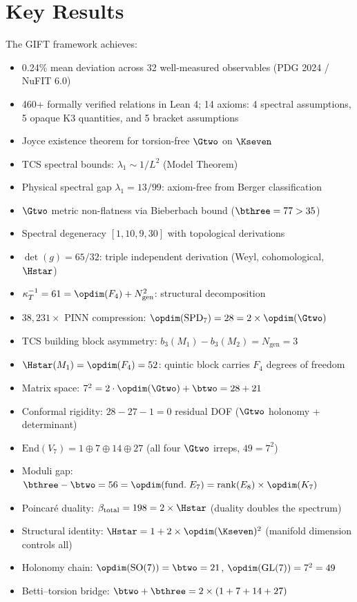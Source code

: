 \section{Key Results}

The GIFT framework achieves:
\begin{itemize}
    \item 0.24\% mean deviation across 32 well-measured observables (PDG 2024 / NuFIT 6.0)
    \item 460+ formally verified relations in Lean 4; 14 axioms: 4 spectral assumptions, 5 opaque K3 quantities, and 5 bracket assumptions
    \item Joyce existence theorem for torsion-free $\Gtwo$ on $\Kseven$
    \item TCS spectral bounds: $\lambda_1 \sim 1/L^2$ (Model Theorem)
    \item Physical spectral gap $\lambda_1 = 13/99$: axiom-free from Berger classification
    \item $\Gtwo$ metric non-flatness via Bieberbach bound ($\bthree = 77 > 35$)
    \item Spectral degeneracy $[1, 10, 9, 30]$ with topological derivations
    \item $\det(g) = 65/32$: triple independent derivation (Weyl, cohomological, $\Hstar$)
    \item $\kappa_T^{-1} = 61 = \opdim(F_4) + N_{\mathrm{gen}}^2$: structural decomposition
    \item $38{,}231\times$ PINN compression: $\opdim(\mathrm{SPD}_7) = 28 = 2 \times \opdim(\Gtwo)$
    \item TCS building block asymmetry: $b_3(M_1) - b_3(M_2) = N_{\mathrm{gen}} = 3$
    \item $\Hstar(M_1) = \opdim(F_4) = 52$: quintic block carries $F_4$ degrees of freedom
    \item Matrix space: $7^2 = 2 \cdot \opdim(\Gtwo) + \btwo = 28 + 21$
    \item Conformal rigidity: $28 - 27 - 1 = 0$ residual DOF ($\Gtwo$ holonomy + determinant)
    \item $\mathrm{End}(V_7) = 1 \oplus 7 \oplus 14 \oplus 27$ (all four $\Gtwo$ irreps, $49 = 7^2$)
    \item Moduli gap: $\bthree - \btwo = 56 = \opdim(\mathrm{fund.}\; E_7) = \mathrm{rank}(E_8) \times \opdim(K_7)$
    \item Poincar\'e duality: $\beta_{\mathrm{total}} = 198 = 2 \times \Hstar$ (duality doubles the spectrum)
    \item Structural identity: $\Hstar = 1 + 2 \times \opdim(\Kseven)^2$ (manifold dimension controls all)
    \item Holonomy chain: $\opdim(\mathrm{SO}(7)) = \btwo = 21$, $\opdim(\mathrm{GL}(7)) = 7^2 = 49$
    \item Betti--torsion bridge: $\btwo + \bthree = 2 \times (1 + 7 + 14 + 27)$
\end{itemize}
